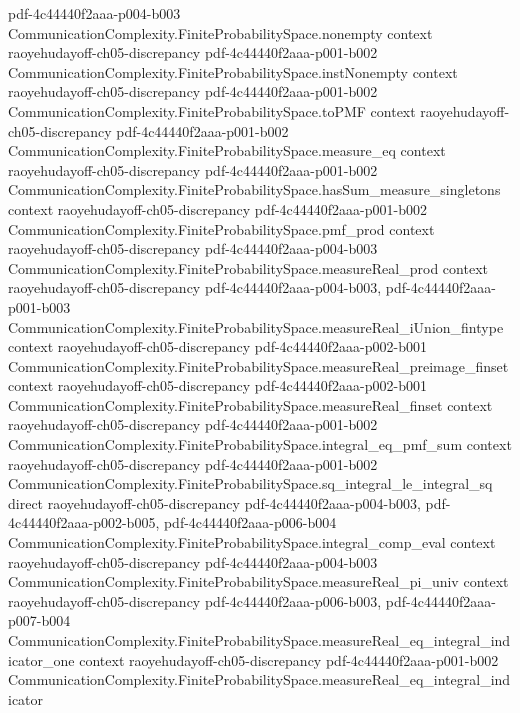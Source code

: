 \begin{theorem}
  {pdf-4c44440f2aaa-p004-b003}
\proofstep
  {CommunicationComplexity.FiniteProbabilitySpace.nonempty}
  {context}
  {raoyehudayoff-ch05-discrepancy}
  {pdf-4c44440f2aaa-p001-b002}
\proofstep
  {CommunicationComplexity.FiniteProbabilitySpace.instNonempty}
  {context}
  {raoyehudayoff-ch05-discrepancy}
  {pdf-4c44440f2aaa-p001-b002}
\proofstep
  {CommunicationComplexity.FiniteProbabilitySpace.toPMF}
  {context}
  {raoyehudayoff-ch05-discrepancy}
  {pdf-4c44440f2aaa-p001-b002}
\proofstep
  {CommunicationComplexity.FiniteProbabilitySpace.measure_eq}
  {context}
  {raoyehudayoff-ch05-discrepancy}
  {pdf-4c44440f2aaa-p001-b002}
\proofstep
  {CommunicationComplexity.FiniteProbabilitySpace.hasSum_measure_singletons}
  {context}
  {raoyehudayoff-ch05-discrepancy}
  {pdf-4c44440f2aaa-p001-b002}
\proofstep
  {CommunicationComplexity.FiniteProbabilitySpace.pmf_prod}
  {context}
  {raoyehudayoff-ch05-discrepancy}
  {pdf-4c44440f2aaa-p004-b003}
\proofstep
  {CommunicationComplexity.FiniteProbabilitySpace.measureReal_prod}
  {context}
  {raoyehudayoff-ch05-discrepancy}
  {pdf-4c44440f2aaa-p004-b003,
    pdf-4c44440f2aaa-p001-b003}
\proofstep
  {CommunicationComplexity.FiniteProbabilitySpace.measureReal_iUnion_fintype}
  {context}
  {raoyehudayoff-ch05-discrepancy}
  {pdf-4c44440f2aaa-p002-b001}
\proofstep
  {CommunicationComplexity.FiniteProbabilitySpace.measureReal_preimage_finset}
  {context}
  {raoyehudayoff-ch05-discrepancy}
  {pdf-4c44440f2aaa-p002-b001}
\proofstep
  {CommunicationComplexity.FiniteProbabilitySpace.measureReal_finset}
  {context}
  {raoyehudayoff-ch05-discrepancy}
  {pdf-4c44440f2aaa-p001-b002}
\proofstep
  {CommunicationComplexity.FiniteProbabilitySpace.integral_eq_pmf_sum}
  {context}
  {raoyehudayoff-ch05-discrepancy}
  {pdf-4c44440f2aaa-p001-b002}
\proofstep
  {CommunicationComplexity.FiniteProbabilitySpace.sq_integral_le_integral_sq}
  {direct}
  {raoyehudayoff-ch05-discrepancy}
  {pdf-4c44440f2aaa-p004-b003,
    pdf-4c44440f2aaa-p002-b005,
    pdf-4c44440f2aaa-p006-b004}
\proofstep
  {CommunicationComplexity.FiniteProbabilitySpace.integral_comp_eval}
  {context}
  {raoyehudayoff-ch05-discrepancy}
  {pdf-4c44440f2aaa-p004-b003}
\proofstep
  {CommunicationComplexity.FiniteProbabilitySpace.measureReal_pi_univ}
  {context}
  {raoyehudayoff-ch05-discrepancy}
  {pdf-4c44440f2aaa-p006-b003,
    pdf-4c44440f2aaa-p007-b004}
\proofstep
  {CommunicationComplexity.FiniteProbabilitySpace.measureReal_eq_integral_indicator_one}
  {context}
  {raoyehudayoff-ch05-discrepancy}
  {pdf-4c44440f2aaa-p001-b002}
\proofstep
  {CommunicationComplexity.FiniteProbabilitySpace.measureReal_eq_integral_indicator}

\end{theorem}
